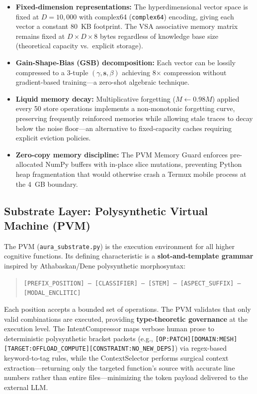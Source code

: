 \documentclass[11pt]{article}
\begin{document}
\begin{itemize}
    \item \textbf{Fixed-dimension representations:} The hyperdimensional vector space is fixed at $D = 10{,}000$ with complex64 (\texttt{complex64}) encoding, giving each vector a constant 80~KB footprint. The VSA associative memory matrix remains fixed at $D \times D \times 8$ bytes regardless of knowledge base size (theoretical capacity vs.\ explicit storage).
    \item \textbf{Gain-Shape-Bias (GSB) decomposition:} Each vector can be lossily compressed to a 3-tuple $(\gamma, \mathbf{s}, \beta)$ achieving 8$\times$ compression without gradient-based training—a zero-shot algebraic technique.
    \item \textbf{Liquid memory decay:} Multiplicative forgetting ($M \leftarrow 0.98M$) applied every 50 store operations implements a non-monotonic forgetting curve, preserving frequently reinforced memories while allowing stale traces to decay below the noise floor—an alternative to fixed-capacity caches requiring explicit eviction policies.
    \item \textbf{Zero-copy memory discipline:} The PVM Memory Guard enforces pre-allocated NumPy buffers with in-place slice mutations, preventing Python heap fragmentation that would otherwise crash a Termux mobile process at the 4~GB boundary.
\end{itemize}

\subsection{Substrate Layer: Polysynthetic Virtual Machine (PVM)}

The PVM (\texttt{aura\_substrate.py}) is the execution environment for all higher cognitive functions. Its defining characteristic is a \textbf{slot-and-template grammar} inspired by Athabaskan/Dene polysynthetic morphosyntax:

\begin{quote}
\small\texttt{[PREFIX\_POSITION] — [CLASSIFIER] — [STEM] — [ASPECT\_SUFFIX] — [MODAL\_ENCLITIC]}
\end{quote}

Each position accepts a bounded set of operations. The PVM validates that only valid combinations are executed, providing \textbf{type-theoretic governance} at the execution level. The IntentCompressor maps verbose human prose to deterministic polysynthetic bracket packets (e.g., \texttt{[OP:PATCH][DOMAIN:MESH][TARGET:OFFLOAD\_COMPUTE][CONSTRAINT:NO\_NEW\_DEPS]}) via regex-based keyword-to-tag rules, while the ContextSelector performs surgical context extraction—returning only the targeted function's source with accurate line numbers rather than entire files—minimizing the token payload delivered to the external LLM.
\end{document}
